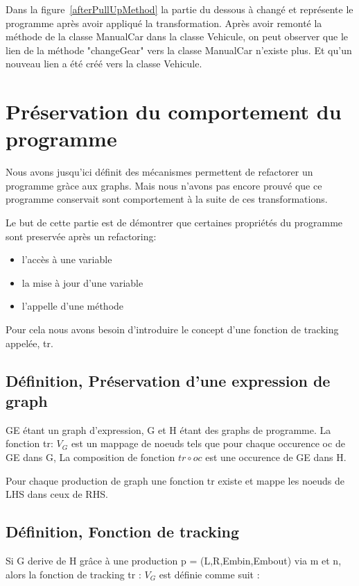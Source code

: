 \documentclass[a4paper, 12pt]{article}
\begin{document}
\begin{enumerate}
Dans la figure~\ref{afterPullUpMethod} la partie du dessous à changé et représente le programme après avoir appliqué la transformation.
Après avoir remonté la méthode de la classe ManualCar dans la classe Vehicule, on peut observer que le lien de la méthode "changeGear" vers la classe ManualCar n'existe plus. Et qu'un nouveau lien a été créé vers la classe Vehicule.

\section{Préservation du comportement du programme}

Nous avons jusqu'ici définit des mécanismes permettent de refactorer un programme gràce aux graphs. Mais nous n'avons pas encore prouvé que ce programme conservait sont comportement à la suite de ces transformations.

Le but de cette partie est de démontrer que certaines propriétés du programme sont preservée après un refactoring:
\begin{itemize}[label=\textbullet]
\item l'accès à une variable
\item la mise à jour d'une variable
\item l'appelle d'une méthode
\end{itemize}

Pour cela nous avons besoin d'introduire le concept d'une fonction de tracking appelée, tr.

\subsection{Définition, Préservation d'une expression de graph}
GE étant un graph d'expression, G et H étant des graphs de programme. La fonction tr: {$V_G$}  est un mappage de noeuds tels que pour chaque occurence oc de GE dans G, La composition de fonction  \(tr \circ oc \) est une occurence de GE dans H.

Pour chaque production de graph une fonction tr existe et mappe les noeuds de LHS dans ceux de RHS.

\subsection{Définition, Fonction de tracking}
Si G derive de H grâce à une production p = (L,R,Embin,Embout) via m et n, alors la fonction de tracking tr : {$V_G$}  est définie comme suit :


\end{enumerate}
\end{document}

